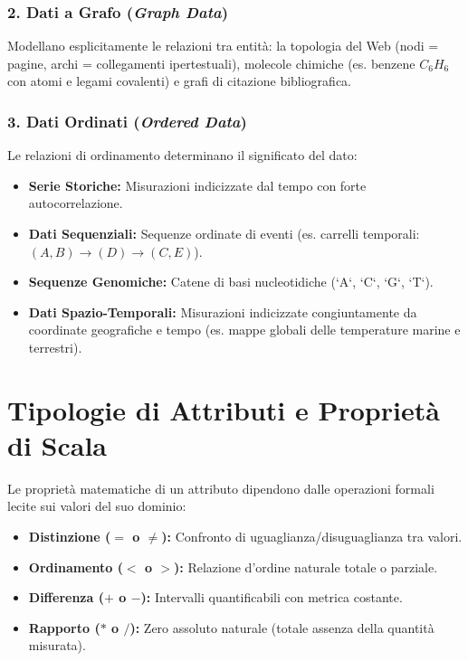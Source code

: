 \subsubsection{2. Dati a Grafo (\textit{Graph Data})}
Modellano esplicitamente le relazioni tra entit\`a: la topologia del Web (nodi = pagine, archi = collegamenti ipertestuali), molecole chimiche (es. benzene $C_6H_6$ con atomi e legami covalenti) e grafi di citazione bibliografica.

\subsubsection{3. Dati Ordinati (\textit{Ordered Data})}
Le relazioni di ordinamento determinano il significato del dato:
\begin{itemize}
    \item \textbf{Serie Storiche:} Misurazioni indicizzate dal tempo con forte autocorrelazione.
    \item \textbf{Dati Sequenziali:} Sequenze ordinate di eventi (es. carrelli temporali: $(A, B) \to (D) \to (C, E)$).
    \item \textbf{Sequenze Genomiche:} Catene di basi nucleotidiche (`A`, `C`, `G`, `T`).
    \item \textbf{Dati Spazio-Temporali:} Misurazioni indicizzate congiuntamente da coordinate geografiche e tempo (es. mappe globali delle temperature marine e terrestri).
\end{itemize}

\FloatBarrier
\section{Tipologie di Attributi e Propriet\`a di Scala}

Le propriet\`a matematiche di un attributo dipendono dalle operazioni formali lecite sui valori del suo dominio:
\begin{itemize}
    \item \textbf{Distinzione ($=$ o $\neq$):} Confronto di uguaglianza/disuguaglianza tra valori.
    \item \textbf{Ordinamento ($<$ o $>$):} Relazione d'ordine naturale totale o parziale.
    \item \textbf{Differenza ($+$ o $-$):} Intervalli quantificabili con metrica costante.
    \item \textbf{Rapporto ($*$ o $/$):} Zero assoluto naturale (totale assenza della quantit\`a misurata).
\end{itemize}

